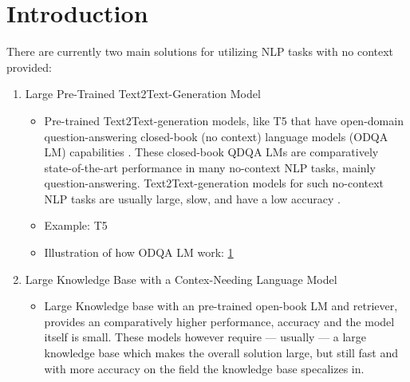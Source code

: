 \section{Introduction}

There are currently two main solutions for utilizing NLP tasks with no context provided: 

\begin{enumerate}[leftmargin=1em]
    \item Large Pre-Trained Text2Text-Generation Model \label{CurrSolOne}
        \begin{itemize}[leftmargin=1em]
            \begin{figure}
                \texttt{[image: t5qa.pdf]}
                \caption{This is an illustration of how ODQA LMs work \cite{https://doi.org/10.48550/arxiv.2002.08910}.}
                \label{fig:CurrSolOneImg}
            \end{figure}
            \item Pre-trained Text2Text-generation models, like T5 \cite{https://doi.org/10.48550/arxiv.1910.10683} that have open-domain question-answering closed-book (no context) language models (ODQA LM) capabilities \cite{weng2020odqa}. These closed-book QDQA LMs are comparatively state-of-the-art performance in many no-context NLP tasks, mainly question-answering. Text2Text-generation models for such no-context NLP tasks are usually large, slow, and have a low accuracy \cite{https://doi.org/10.48550/arxiv.2002.08910}.
            \item Example: T5 \cite{https://doi.org/10.48550/arxiv.1910.10683}
            \item Illustration of how ODQA LM work: \ref{fig:CurrSolOneImg}
        \end{itemize}
    \item Large Knowledge Base with a Contex-Needing Language Model \label{CurrSolTwo}
        \begin{itemize}[leftmargin=1em]
            \begin{figure}
                \texttt{[image: artefacts\_diagram.pdf]}
                \caption{This is an illustration of how LMs with a knowledge base and artifact retriver work \cite{https://doi.org/10.48550/arxiv.2201.09651}.}
                \label{fig:CurrSolTwoImg}
            \end{figure}
            \item Large Knowledge base with an pre-trained open-book LM and retriever, provides an comparatively higher performance, accuracy and the model itself is small. These models however require --- usually --- a large knowledge base which makes the overall solution large, but still fast and with more accuracy on the field the knowledge base specalizes in.

\end{itemize}
\end{enumerate}
